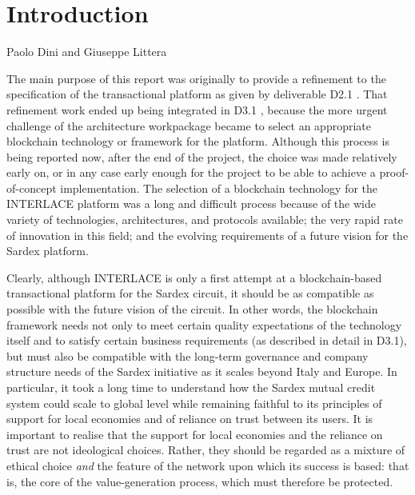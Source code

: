 \chapter{Introduction}
\label{ch:Introduction}

\vspace{-1cm}
\begin{center}
Paolo Dini and Giuseppe Littera
\end{center}

The main purpose of this report was originally to provide a refinement to the specification of the transactional platform as given by deliverable D2.1 \cite{INTERLACE_D21}. That refinement work ended up being integrated in D3.1 \cite{INTERLACE_D31}, because the more urgent challenge of the architecture workpackage became to select an appropriate blockchain technology or framework for the platform. Although this process is being reported now, after the end of the project, the choice was made relatively early on, or in any case early enough for the project to be able to achieve a proof-of-concept implementation. The selection of a blockchain technology for the INTERLACE platform was a long and difficult process because of the wide variety of technologies, architectures, and protocols available; the very rapid rate of innovation in this field; and the evolving requirements of a future vision for the Sardex platform.

Clearly, although INTERLACE is only a first attempt at a blockchain-based transactional platform for the Sardex circuit, it should be as compatible as possible with the future vision of the circuit. In other words, the blockchain framework needs not only to meet certain quality expectations of the technology itself and to satisfy certain business requirements (as described in detail in D3.1), but must also be compatible with the long-term governance and company structure needs of the Sardex initiative as it scales beyond Italy and Europe. In particular, it took a long time to understand how the Sardex mutual credit system could scale to global level while remaining faithful to its principles of support for local economies and of reliance on trust between its users. It is important to realise that the support for local economies and the reliance on trust are not ideological choices. Rather, they should be regarded as a mixture of ethical choice \emph{and} the feature of the network upon which its success is based: that is, the core of the value-generation process, which must therefore be protected.

